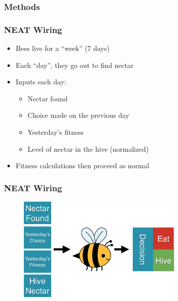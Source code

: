 \documentclass{beamer}
\begin{document}
      \subsubsection{Methods} %
      \label{ssub:methods}
        \begin{frame}[c]\frametitle{NEAT Wiring}
            
          \begin{itemize}
            \item Bees live for a ``week'' (7 days)
            \item Each ``day'', they go out to find nectar
            \bigskip
            \item Inputs each day:
            \begin{itemize}
                \item Nectar found
                \item Choice made on the previous day
                \item Yesterday's fitness
                \item Level of nectar in the hive (normalized)
            \end{itemize}
            \item Fitness calculations then proceed as normal

          \end{itemize}
        
        \end{frame}
        \begin{frame}[t]\frametitle{NEAT Wiring}
          \begin{figure}
          \includegraphics[width=8cm]{bee_diagrams/recurrent_system.png}
          \end{figure}
        \end{frame}
\end{document}
